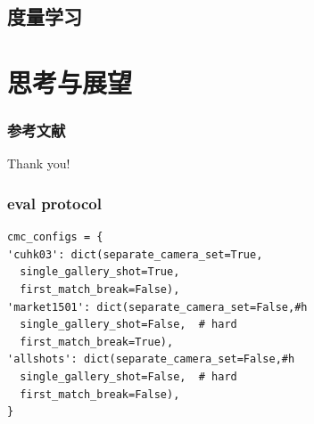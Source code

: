 \documentclass[notes]{beamer}
\newcommand{\chuhao}{\fontsize{44.9pt}{\baselineskip}\selectfont}
\begin{document}
\subsection{度量学习}

\section{思考与展望}

\begin{frame}[t, allowframebreaks]
	\frametitle{参考文献}
	\printbibliography
\end{frame}

\begin{frame}
	\chuhao Thank you! %
\end{frame}


\begin{frame}[fragile]
	\frametitle{eval protocol}
\begin{lstlisting}
cmc_configs = {
'cuhk03': dict(separate_camera_set=True,
  single_gallery_shot=True,
  first_match_break=False),
'market1501': dict(separate_camera_set=False,#h
  single_gallery_shot=False,  # hard
  first_match_break=True),
'allshots': dict(separate_camera_set=False,#h
  single_gallery_shot=False,  # hard
  first_match_break=False),
}
\end{lstlisting}
\end{frame}
\end{document}
